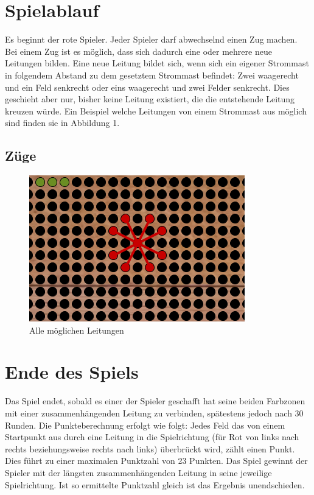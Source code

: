 \documentclass[a4paper, ngerman]{scrartcl}
\begin{document}
\section{Spielablauf}	 

	Es beginnt der rote Spieler. Jeder Spieler darf abwechselnd einen
	Zug machen. Bei einem Zug ist es möglich, dass sich dadurch eine oder mehrere
	neue Leitungen bilden. Eine neue Leitung bildet sich, wenn sich ein eigener
	Strommast in folgendem Abstand zu dem gesetztem Strommast befindet: Zwei
	waagerecht und ein Feld senkrecht oder eins waagerecht und zwei Felder
	senkrecht. Dies geschieht aber nur, bisher keine Leitung existiert, die die
	entstehende Leitung kreuzen würde.
	Ein Beispiel welche Leitungen von einem Strommast aus möglich sind finden sie
	in Abbildung 1.
	 
	
	
	\subsection{Züge}
	
	\begin{figure}[h!]
		\centering
		\includegraphics[scale = 0.8]{bilder/setzzug.png}
		\caption{Alle möglichen Leitungen}
		\label{fig:Leitungen}
	\end{figure}
	
\section{Ende des Spiels} 
	Das Spiel endet, sobald es einer der Spieler geschafft hat seine beiden
	Farbzonen mit einer zusammenhängenden Leitung zu verbinden, spätestens jedoch
	nach 30 Runden.
	Die Punkteberechnung erfolgt wie folgt: Jedes Feld das von einem Startpunkt aus
	durch eine Leitung in die Spielrichtung (für Rot von links nach rechts
	beziehungsweise rechts nach links) überbrückt wird, zählt einen Punkt. Dies
	führt zu einer maximalen Punktzahl von 23 Punkten. Das Spiel gewinnt der
	Spieler mit der längsten zusammenhängenden Leitung in seine jeweilige
	Spielrichtung.
	Ist so ermittelte Punktzahl gleich ist das Ergebnis unendschieden.
	
\end{document}
